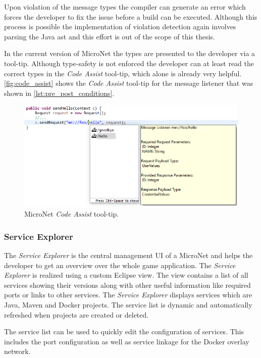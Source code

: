 Upon violation of the message types the compiler can generate an error which
forces the developer to fix the issue before a build can be executed.
Although this process is possible the implementation of violation detection
again involves parsing the Java \gls{ast} and this effort is out of the scope of
this thesis.

In the current version of MicroNet the types are presented to the developer via
a tool-tip. Although type-safety is not enforced the developer can at least read
the correct types in the \textit{Code Assist} tool-tip, which alone is already
very helpful. \autoref{fig:code_assist} shows the \textit{Code Assist} tool-tip
for the  message listener that was shown in 
\autoref{lst:pre_post_conditions}.

\begin{figure}
	\centering
	\includegraphics[width=\textwidth]{images/tools/CodeAssist}
	\caption{MicroNet \textit{Code Assist} tool-tip.}
	\label{fig:code_assist}
\end{figure}

\subsubsection{Service Explorer}

The \textit{Service Explorer} is the central management UI of a MicroNet and
helps the developer to get an overview over the whole game application. The
\textit{Service Explorer} is realized using a custom Eclipse view. The view
contains a list of all services showing their versions along with other useful
information like required ports or links to other services. The \textit{Service
Explorer} displays services which are Java, Maven and Docker projects. The
service list is dynamic and automatically refreshed when projects are created or
deleted.

The service list can be used to quickly edit the configuration of services. This
includes the port configuration as well as service linkage for the Docker
overlay network.

